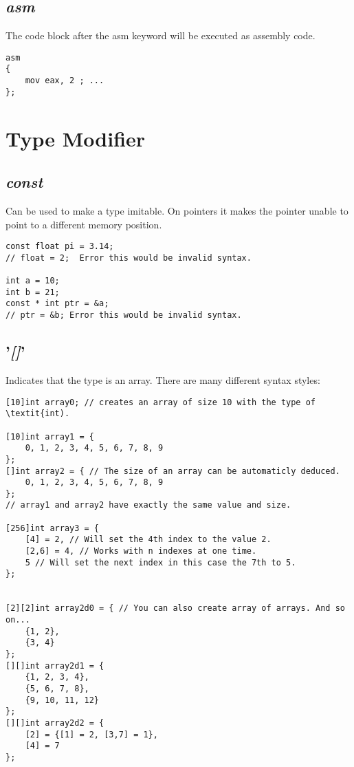 \documentclass[10pt,a4paper]{article}
\begin{document}
\subsection{\textit{asm}}
The code block after the asm keyword will be executed as assembly code.
\begin{lstlisting}
asm
{
	mov eax, 2 ; ...
};
\end{lstlisting}




\section{Type Modifier}


\subsection{\textit{const}}
Can be used to make a type imitable.
On pointers it makes the pointer unable to point to a different memory position.
\begin{lstlisting}
const float pi = 3.14;
// float = 2;  Error this would be invalid syntax.

int a = 10;
int b = 21;
const * int ptr = &a;
// ptr = &b; Error this would be invalid syntax.
\end{lstlisting}


\subsection{'\textit{[]}'}
Indicates that the type is an array.
There are many different syntax styles:
\begin{lstlisting}
[10]int array0; // creates an array of size 10 with the type of \textit{int).

[10]int array1 = {
	0, 1, 2, 3, 4, 5, 6, 7, 8, 9
};
[]int array2 = { // The size of an array can be automaticly deduced.
	0, 1, 2, 3, 4, 5, 6, 7, 8, 9
};
// array1 and array2 have exactly the same value and size.

[256]int array3 = {
	[4] = 2, // Will set the 4th index to the value 2.
	[2,6] = 4, // Works with n indexes at one time.
	5 // Will set the next index in this case the 7th to 5.
};


[2][2]int array2d0 = { // You can also create array of arrays. And so on...
	{1, 2},
	{3, 4}
};
[][]int array2d1 = {
	{1, 2, 3, 4},
	{5, 6, 7, 8},
	{9, 10, 11, 12}
};
[][]int array2d2 = {
	[2] = {[1] = 2, [3,7] = 1},
	[4] = 7
};

\end{lstlisting}
\end{document}

